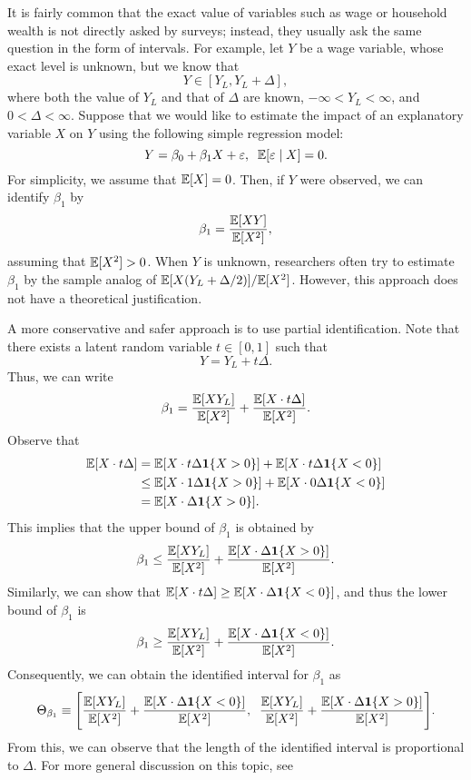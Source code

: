 \documentclass[11pt, A4paper, openany, uplatex]{book}
\begin{document}
\begin{example}\upshape
	It is fairly common that the exact value of variables such as wage or household wealth is not directly asked by surveys; instead, they usually ask the same question in the form of intervals.
	For example, let $Y$ be a wage variable, whose exact level is unknown, but we know that
	\[
	Y \in [Y_L, Y_L + \Delta],
	\]
	where both the value of $Y_L$ and that of $\Delta$ are known, $-\infty < Y_L < \infty$, and $0 < \Delta < \infty$.
	Suppose that we would like to estimate the impact of an explanatory variable $X$ on $Y$ using the following simple 	regression model:
	\[
	Y =  \beta_0 +  \beta_1 X + \varepsilon, \;\; \mathbb{E}[\varepsilon \mid X] = 0.
	\]
	For simplicity, we assume that $\mathbb{E} [X] = 0$.
	Then, if $Y$ were observed, we can identify $\beta_1$ by
	\[
		 \beta_1 = \frac{\mathbb{E}[ XY ]}{\mathbb{E}[X^2]},
	\]
	assuming that $\mathbb{E} [X^2] > 0$.
	When $Y$ is unknown, researchers often try to estimate $\beta_1$ by the sample analog of $\mathbb{E} [X(Y_L + \Delta/2)]/\mathbb{E}[X^2]$.
	However, this approach does not have a theoretical justification.
	\bigskip

	A more conservative and safer approach is to use partial identification. 
	Note that there exists a latent random variable $t \in [0, 1]$ such that
	\[
		Y = Y_L + t \Delta.
	\]
	Thus, we can write
	\[
		\beta_1 = \frac{\mathbb{E}[XY_L]}{\mathbb{E}[X^2]} + \frac{\mathbb{E}[X \cdot t \Delta]}{\mathbb{E}[X^2]}.
	\]
	Observe that
	\begin{align*}
		\mathbb{E}[X \cdot  t\Delta] 
		& =  \mathbb{E}[X \cdot  t \Delta\mathbf{1}\{ X > 0 \}] + \mathbb{E}[X \cdot  t \Delta\mathbf{1}\{ X < 0\}] \\
		& \le \mathbb{E}[X \cdot  1 \Delta\mathbf{1}\{ X > 0 \}] + \mathbb{E}[X \cdot  0 \Delta\mathbf{1}\{ X < 0\}] \\
		& =  \mathbb{E}[X \cdot  \Delta\mathbf{1}\{ X > 0\}].
	\end{align*}
	This implies that the upper bound of  $\beta_1$ is obtained by
	\[
	 	\beta_1 \le \frac{\mathbb{E}[XY_L]}{\mathbb{E}[X^2]} + \frac{\mathbb{E}[X \cdot \Delta\mathbf{1}\{ X > 0\}]}{\mathbb{E}[X^2]}	.
	 \]
	Similarly, we can show that $\mathbb{E} [X \cdot t\Delta] \ge \mathbb{E}[X \cdot \Delta\mathbf{1}\{ X < 0\}]$, and thus the lower bound of  $\beta_1$ is
	\[
		\beta_1 \ge \frac{\mathbb{E}[XY_L]}{\mathbb{E}[X^2]} + \frac{\mathbb{E}[X \cdot \Delta\mathbf{1}\{ X < 0\}]}{\mathbb{E}[X^2]}.
	\]
	Consequently, we can obtain the identified interval for  $\beta_1$ as
	\[
	\Theta_{\beta_1} \equiv \Bigg[
	\frac{\mathbb{E}[XY_L]}{\mathbb{E}[X^2]} + \frac{\mathbb{E}[X \cdot \Delta \mathbf{1}\{ X < 0 \}]}{\mathbb{E}[X^2]},
	\;\;
	\frac{\mathbb{E}[XY_L]}{\mathbb{E}[X^2]} + \frac{\mathbb{E}[X \cdot \Delta\mathbf{1}\{ X > 0 \}]}{\mathbb{E}[X^2]}
	\Bigg].
	\]
	From this, we can observe that the length of the identified interval is proportional to $\Delta$.
	For more general discussion on this topic, see \cite{bontemps2012set}
\end{example}
\end{document}
